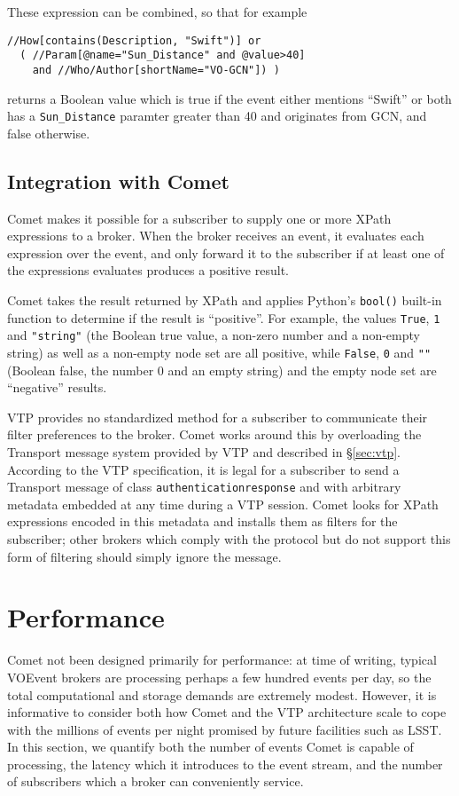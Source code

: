 \documentclass[5p,authoryear]{elsarticle}
\begin{document}
These expression can be combined, so that for example
\begin{verbatim}
//How[contains(Description, "Swift")] or
  ( //Param[@name="Sun_Distance" and @value>40]
    and //Who/Author[shortName="VO-GCN"]) )
\end{verbatim}
returns a Boolean value which is true if the event either mentions ``Swift''
or both has a \texttt{Sun\_Distance} paramter greater than 40 and originates
from GCN, and false otherwise.

\subsection{Integration with Comet}

Comet makes it possible for a subscriber to supply one or more XPath
expressions to a broker. When the broker receives an event, it evaluates each
expression over the event, and only forward it to the subscriber if at least
one of the expressions evaluates produces a positive result.

Comet takes the result returned by XPath and applies Python's \texttt{bool()}
built-in function to determine if the result is ``positive''. For example, the
values \texttt{True}, \texttt{1} and \texttt{"string"} (the Boolean true
value, a non-zero number and a non-empty string) as well as a non-empty node
set are all positive, while \texttt{False}, \texttt{0} and \texttt{""}
(Boolean false, the number 0 and an empty string) and the empty node set are
``negative'' results.

VTP provides no standardized method for a subscriber to communicate their
filter preferences to the broker. Comet works around this by overloading the
Transport message system provided by VTP and described in \S\ref{sec:vtp}.
According to the VTP specification, it is legal for a subscriber to send a
Transport message of class \texttt{authenticationresponse} and with arbitrary
metadata embedded at any time during a VTP session. Comet looks for XPath
expressions encoded in this metadata and installs them as filters for the
subscriber; other brokers which comply with the protocol but do not support
this form of filtering should simply ignore the message.

\section{Performance}
\label{sec:perf}

Comet not been designed primarily for performance: at time of writing, typical
VOEvent brokers are processing perhaps a few hundred events per day, so the
total computational and storage demands are extremely modest. However, it is
informative to consider both how Comet and the VTP architecture scale to cope
with the millions of events per night promised by future facilities such as
LSST. In this section, we quantify both the number of events Comet is capable
of processing, the latency which it introduces to the event stream, and the
number of subscribers which a broker can conveniently service.
\end{document}

